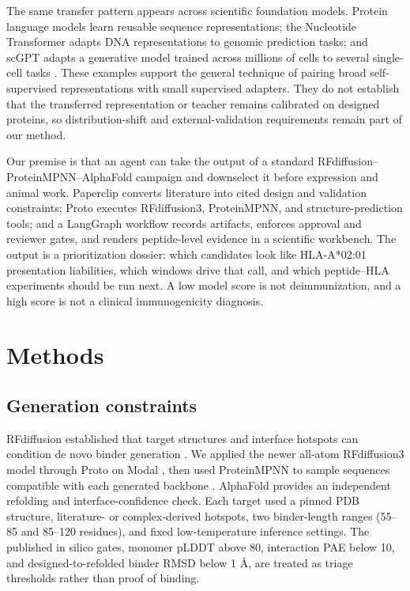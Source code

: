 \documentclass{article}
\begin{document}
The same transfer pattern appears across scientific foundation models. Protein language models learn reusable sequence representations; the Nucleotide Transformer adapts DNA representations to genomic prediction tasks; and scGPT adapts a generative model trained across millions of cells to several single-cell tasks \cite{lin2023esm2,dallatorre2024nucleotide,cui2023scgpt}. These examples support the general technique of pairing broad self-supervised representations with small supervised adapters. They do not establish that the transferred representation or teacher remains calibrated on designed proteins, so distribution-shift and external-validation requirements remain part of our method.

Our premise is that an agent can take the output of a standard RFdiffusion--ProteinMPNN--AlphaFold campaign and downselect it before expression and animal work. Paperclip converts literature into cited design and validation constraints; Proto executes RFdiffusion3, ProteinMPNN, and structure-prediction tools; and a LangGraph workflow records artifacts, enforces approval and reviewer gates, and renders peptide-level evidence in a scientific workbench. The output is a prioritization dossier: which candidates look like HLA-A*02:01 presentation liabilities, which windows drive that call, and which peptide--HLA experiments should be run next. A low model score is not deimmunization, and a high score is not a clinical immunogenicity diagnosis.

\section{Methods}
\subsection{Generation constraints}
RFdiffusion established that target structures and interface hotspots can condition de novo binder generation \cite{watson2023rfdiffusion}. We applied the newer all-atom RFdiffusion3 model through Proto on Modal \cite{butcher2025rfdiffusion3}, then used ProteinMPNN to sample sequences compatible with each generated backbone \cite{dauparas2022proteinmpnn}. AlphaFold provides an independent refolding and interface-confidence check. Each target used a pinned PDB structure, literature- or complex-derived hotspots, two binder-length ranges (55--85 and 85--120 residues), and fixed low-temperature inference settings. The published in silico gates, monomer pLDDT above 80, interaction PAE below 10, and designed-to-refolded binder RMSD below 1 \AA, are treated as triage thresholds rather than proof of binding.
\end{document}
